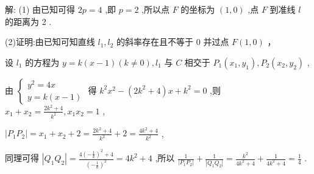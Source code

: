 \documentclass[10pt]{article}
\begin{document}
解: (1) 由已知可得 \({2p} = 4\) ,即 \(p = 2\) ,所以点 \(F\) 的坐标为 \(\left( {1,0}\right)\) ,点 \(F\) 到准线 \(l\) 的距离为 2 .

(2)证明:由已知可知直线 \({l}_{1},{l}_{2}\) 的斜率存在且不等于 0 并过点 \(F\left( {1,0}\right)\) ，

设 \({l}_{1}\) 的方程为 \(y = k\left( {x - 1}\right) \left( {k \neq  0}\right) ,{l}_{1}\) 与 \(C\) 相交于 \({P}_{1}\left( {{x}_{1},{y}_{1}}\right) ,{P}_{2}\left( {{x}_{2},{y}_{2}}\right)\) ,

由 \(\left\{  \begin{array}{l} {y}^{2} = {4x} \\  y = k\left( {x - 1}\right)  \end{array}\right.\) 得 \({k}^{2}{x}^{2} - \left( {2{k}^{2} + 4}\right) x + {k}^{2} = 0\) ,则 \({x}_{1} + {x}_{2} = \frac{2{k}^{2} + 4}{{k}^{2}},{x}_{1}{x}_{2} = 1\) ,

\(\left| {{P}_{1}{P}_{2}}\right|  = {x}_{1} + {x}_{2} + 2 = \frac{2{k}^{2} + 4}{{k}^{2}} + 2 = \frac{4{k}^{2} + 4}{{k}^{2}}\) ,

同理可得 \(\left| {{Q}_{1}{Q}_{2}}\right|  = \frac{4{\left( -\frac{1}{k}\right) }^{2} + 4}{{\left( -\frac{1}{k}\right) }^{2}} = 4{k}^{2} + 4\) ,所以 \(\frac{1}{\left| {P}_{1}{P}_{2}\right| } + \frac{1}{\left| {Q}_{1}{Q}_{2}\right| } = \frac{{k}^{2}}{4{k}^{2} + 4} + \frac{1}{4{k}^{2} + 4} = \frac{1}{4}\) .
\end{document}
